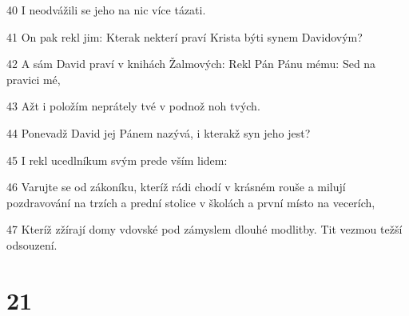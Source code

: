 \par 40 I neodvážili se jeho na nic více tázati.
\par 41 On pak rekl jim: Kterak nekterí praví Krista býti synem Davidovým?
\par 42 A sám David praví v knihách Žalmových: Rekl Pán Pánu mému: Sed na pravici mé,
\par 43 Ažt i položím neprátely tvé v podnož noh tvých.
\par 44 Ponevadž David jej Pánem nazývá, i kterakž syn jeho jest?
\par 45 I rekl ucedlníkum svým prede vším lidem:
\par 46 Varujte se od zákoníku, kteríž rádi chodí v krásném rouše a milují pozdravování na trzích a prední stolice v školách a první místo na vecerích,
\par 47 Kteríž zžírají domy vdovské pod zámyslem dlouhé modlitby. Tit vezmou težší odsouzení.

\chapter{21}

